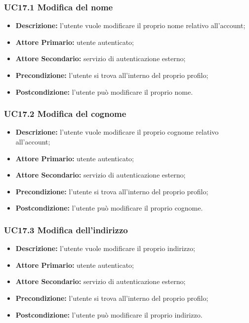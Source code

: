 \subsubsection{UC17.1 Modifica del nome}
\label{sec:UC17.1}
\begin{itemize}
    \item \textbf{Descrizione:} l'utente vuole modificare il proprio nome relativo all'account;
    \item \textbf{Attore Primario:} utente autenticato;
    \item \textbf{Attore Secondario:} servizio di autenticazione esterno;
    \item \textbf{Precondizione:} l'utente si trova all'interno del proprio profilo;
    \item \textbf{Postcondizione:} l'utente può modificare il proprio nome.
\end{itemize}

\subsubsection{UC17.2 Modifica del cognome}
\label{sec:UC17.2}
\begin{itemize}
    \item \textbf{Descrizione:} l'utente vuole modificare il proprio cognome relativo all'account;
    \item \textbf{Attore Primario:} utente autenticato;
    \item \textbf{Attore Secondario:} servizio di autenticazione esterno;
    \item \textbf{Precondizione:} l'utente si trova all'interno del proprio profilo;
    \item \textbf{Postcondizione:} l'utente può modificare il proprio cognome.
\end{itemize}

\subsubsection{UC17.3 Modifica dell'indirizzo}
\label{sec:UC17.3}
\begin{itemize}
    \item \textbf{Descrizione:} l'utente vuole modificare il proprio indirizzo;
    \item \textbf{Attore Primario:} utente autenticato;
    \item \textbf{Attore Secondario:} servizio di autenticazione esterno;
    \item \textbf{Precondizione:} l'utente si trova all'interno del proprio profilo;
    \item \textbf{Postcondizione:} l'utente può modificare il proprio indirizzo.
\end{itemize}

